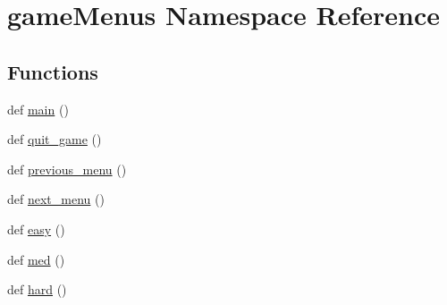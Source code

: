\hypertarget{namespacegame_menus}{}\section{game\+Menus Namespace Reference}
\label{namespacegame_menus}
\subsection*{Functions}
\begin{DoxyCompactItemize}
\item 
def \hyperlink{namespacegame_menus_a4f85966223fa1b95eb213a36fc765b82}{main} ()
\item 
def \hyperlink{namespacegame_menus_a66dbbc5a74ad9c4a02f1661a10a69ad9}{quit\+\_\+game} ()
\item 
def \hyperlink{namespacegame_menus_af6914228389df9b4614e93c7c6836b67}{previous\+\_\+menu} ()
\item 
def \hyperlink{namespacegame_menus_af87fbd020405958cc021f902765a7e0d}{next\+\_\+menu} ()
\item 
def \hyperlink{namespacegame_menus_a6cce73d91a8b2e724b5907be9a6dad0a}{easy} ()
\item 
def \hyperlink{namespacegame_menus_a8ca037940ec4a6f5c27ca4e93d7b9356}{med} ()
\item 
def \hyperlink{namespacegame_menus_a94bf0bd58ca97e1ea8ddc80e376f7533}{hard} ()
\end{DoxyCompactItemize}
